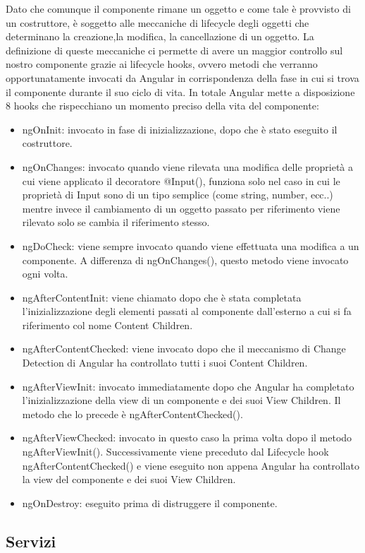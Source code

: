 Dato che comunque il componente rimane un oggetto e come tale è provvisto di un costruttore, è soggetto alle meccaniche di lifecycle degli oggetti che determinano la creazione,la modifica, la cancellazione di un oggetto. La definizione di queste meccaniche ci permette di avere un maggior controllo sul nostro componente grazie ai lifecycle hooks, ovvero metodi che verranno opportunatamente invocati da Angular in corrispondenza della fase in cui si trova il componente durante il suo ciclo di vita. In totale Angular mette a disposizione 8 hooks che rispecchiano un momento preciso della vita del componente:
\begin{itemize}
\item ngOnInit: invocato in fase di inizializzazione, dopo che è stato eseguito il costruttore.
\item ngOnChanges: invocato quando viene rilevata una modifica delle proprietà a cui viene applicato il decoratore @Input(), funziona solo nel caso in cui le proprietà di Input sono di un tipo semplice (come string, number, ecc..) mentre invece il cambiamento di un oggetto passato per riferimento viene rilevato solo se cambia il riferimento stesso.
\item ngDoCheck: viene sempre invocato quando viene effettuata una modifica a un componente. A differenza di ngOnChanges(), questo metodo viene invocato ogni volta.
\item ngAfterContentInit: viene chiamato dopo che è stata completata l'inizializzazione degli elementi passati al componente dall'esterno a cui si fa riferimento col nome Content Children.
\item ngAfterContentChecked: viene invocato dopo che il meccanismo di Change Detection di Angular ha controllato tutti i suoi Content Children.
\item ngAfterViewInit: invocato immediatamente dopo che Angular ha completato l'inizializzazione della view di un componente e dei suoi View Children. Il metodo che lo precede è ngAfterContentChecked().
\item ngAfterViewChecked: invocato in questo caso la prima volta dopo il metodo ngAfterViewInit(). Successivamente viene preceduto dal Lifecycle hook ngAfterContentChecked() e viene eseguito non appena Angular ha controllato la view del componente e dei suoi View Children.
\item ngOnDestroy: eseguito prima di distruggere il componente.
\end{itemize}


\subsection{Servizi}

